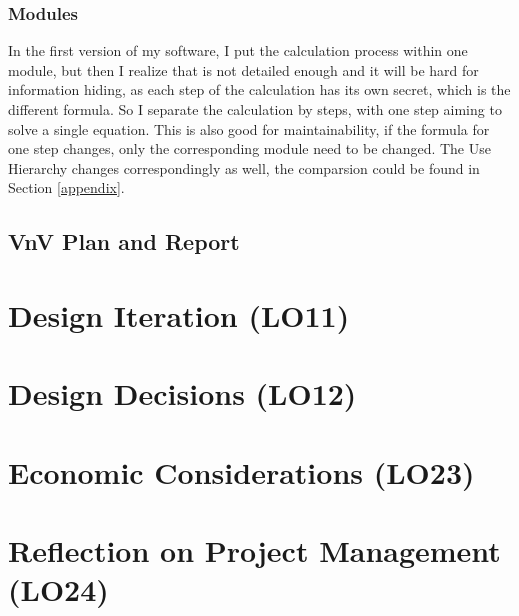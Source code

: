 \documentclass{article}
\begin{document}
\subsubsection{Modules}
In the first version of my software, I put the calculation process within one module, but then I realize that is not detailed enough and it will be hard for information hiding, as each step of the calculation has its own secret, which is the different formula. So I separate the calculation by steps, with one step aiming to solve a single equation. This is also good for maintainability, if the formula for one step changes, only the corresponding module need to be changed. The Use Hierarchy changes correspondingly as well, the comparsion could be found in Section \ref{appendix}.


\subsection{VnV Plan and Report}

\section{Design Iteration (LO11)}


\section{Design Decisions (LO12)}


\section{Economic Considerations (LO23)}


\section{Reflection on Project Management (LO24)}
\end{document}
